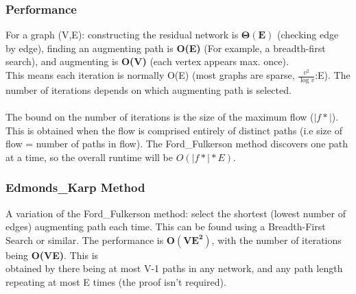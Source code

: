 \subsubsection{Performance}
For a graph (V,E): constructing the residual network is $\boldsymbol{\Theta(E)}$ (checking edge by edge), finding an augmenting path is \textbf{O(E)} (For example, a breadth-first search), and augmenting is \textbf{O(V)} (each vertex appears max. once). \\
This means each iteration is normally O(E) (most graphs are sparse, $\frac{v^2}{\log v}$:E). The number of iterations depends on which augmenting path is selected.\\ \\
The bound on the number of iterations is the size of the maximum flow ($|f*|$). This is obtained when the flow is comprised entirely of distinct paths (i.e size of flow = number of paths in flow). The Ford\_Fulkerson method discovers one path at a time, so the overall runtime will be $O(|f*|*E)$.

\subsubsection{Edmonds\_Karp Method}
A variation of the Ford\_Fulkerson method: select the shortest (lowest number of edges) augmenting path each time. This can be found using a Breadth-First Search or similar. The performance is $\boldsymbol{O(VE^2)}$, with the number of iterations being \textbf{O(VE)}. This is \\obtained by there being at most V-1 paths in any network, and any path length repeating at most E times (the proof isn't required).

